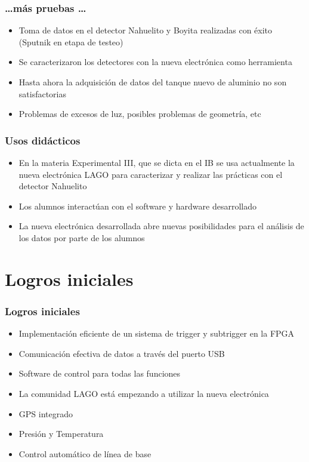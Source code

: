 \documentclass{beamer}
\begin{document}
\begin{frame}
	\frametitle{\ldots más pruebas \ldots}
		\begin{block}{}
    	\begin{itemize}
      	\item Toma de datos en el detector Nahuelito y  
							Boyita realizadas con éxito (Sputnik en 
							etapa de testeo)
 				\item Se caracterizaron los detectores con la 
							nueva electrónica como herramienta
      	\item Hasta ahora la adquisición de datos del 
							tanque nuevo de aluminio no son 
							satisfactorias
      	\item Problemas de excesos de luz, posibles
							problemas de geometría, etc 
    	\end{itemize}
		\end{block}
\end{frame} 

\begin{frame}
	\frametitle{Usos didácticos}
		\begin{block}{}
    	\begin{itemize}
				\item En la materia Experimental III, que se 
							dicta en el IB se usa actualmente la 
							nueva electrónica LAGO para caracterizar 
							y realizar las prácticas con el detector 
							Nahuelito
				\item Los alumnos interactúan con el software 
							y hardware desarrollado 
				\item La nueva electrónica desarrollada abre 
							nuevas posibilidades para el análisis de 
							los datos por parte de los alumnos
    	\end{itemize}
		\end{block}
\end{frame} 

\section[Logros]{Logros iniciales}

\begin{frame}
	\frametitle{Logros iniciales}
		\begin{block}{}
    	\begin{itemize}
				\item Implementación eficiente de un sistema 
							de trigger y subtrigger en la FPGA
				\item Comunicación efectiva de datos a través 
							del puerto USB
				\item Software de control para todas las 
							funciones
				\item La comunidad LAGO está empezando a 
							utilizar la nueva electrónica
				\item GPS integrado
				\item Presión y Temperatura
				\item Control automático de línea de base
    	\end{itemize}
		\end{block}
\end{frame} 
\end{document}
